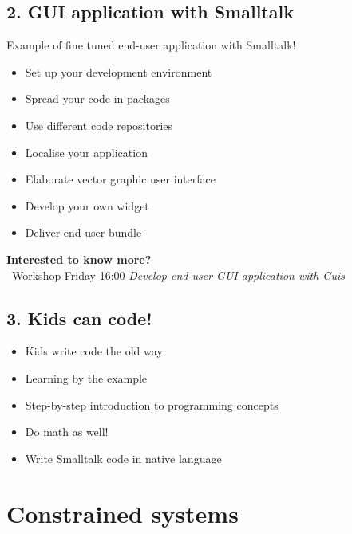 \documentclass{beamer}
\newcommand{\tip}{\boldmath{\textcolor{red}{$\Rightarrow$}}}
\begin{document}
\subsection{2. GUI application with Smalltalk}
\begin{frame}
Example of fine tuned end-user application with \alert{Smalltalk}!
\begin{itemize}
\item Set up your development environment
\item Spread your code in packages
\item Use different code repositories 
\item Localise your application
\item Elaborate vector graphic user interface
\item Develop your own widget
\item Deliver end-user bundle
\end{itemize}
\vspace*{1cm}
\textbf{Interested to know more?} \\
\tip\ Workshop Friday 16:00 \alert{\emph{Develop end-user GUI
  application with Cuis}}
\end{frame}

\subsection{3. Kids can code!}
\begin{frame}
  \begin{itemize}
  \item Kids write code the old way 
  \item Learning by the example
  \item Step-by-step introduction to programming concepts
  \item Do math as well!
  \item Write \alert{Smalltalk} code in native language
  \end{itemize}
\end{frame}

\section{Constrained systems}
\end{document}

